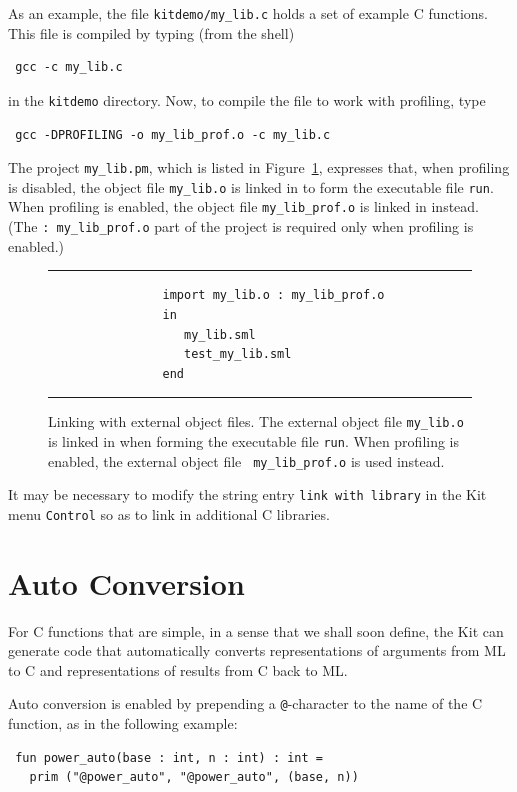 \documentclass[12pt]{book}
\begin{document}
As an example, the file \verb|kitdemo/my_lib.c| holds a set of example
C functions. This file is compiled by typing (from the shell)
\begin{verbatim}
 gcc -c my_lib.c
\end{verbatim}
in the {\tt kitdemo} directory. Now, to compile the file to work with
profiling, type
\begin{verbatim}
 gcc -DPROFILING -o my_lib_prof.o -c my_lib.c
\end{verbatim}

The project \verb|my_lib.pm|, which is listed in Figure~\ref{my_lib.pm.fig},
expresses that, when profiling is disabled, the object file
\verb|my_lib.o| is linked in to form the executable file {\tt run}.
When profiling is enabled, the object file \verb|my_lib_prof.o| is
linked in instead. (The \verb|: my_lib_prof.o| part of the project is
required only when profiling is enabled.)
\begin{figure}
\hrule \medskip
\begin{verbatim}
                import my_lib.o : my_lib_prof.o
                in 
                   my_lib.sml 
                   test_my_lib.sml
                end
\end{verbatim}
\caption{Linking with external object files. The external object 
  file {\tt my\_lib.o} is linked in when forming the executable file
  {\tt run}. When profiling is enabled, the external object file {\tt
    my\_lib\_prof.o} is used instead.}
\label{my_lib.pm.fig}
\medskip \hrule
\end{figure}

It may be necessary to modify the string entry \texttt{link with
  library} in the Kit menu {\tt Control} so as to link in additional C
libraries.

\section{Auto Conversion} 
% 
For C functions that are simple, in a sense
that we shall soon define, the Kit can generate code that
automatically converts representations of arguments from ML to C and
representations of results from C back to ML.

Auto conversion is enabled by prepending a {\tt @}-character to
the name of the C function, as in the following example:
\begin{verbatim}
 fun power_auto(base : int, n : int) : int = 
   prim ("@power_auto", "@power_auto", (base, n))
\end{verbatim}
\end{document}
